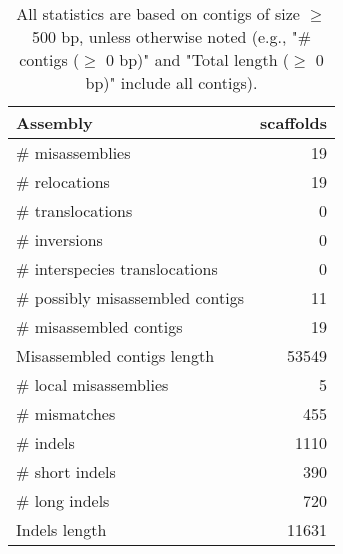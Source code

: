 \documentclass[12pt,a4paper]{article}
\begin{document}
\begin{table}[ht]
\begin{center}
\caption{All statistics are based on contigs of size $\geq$ 500 bp, unless otherwise noted (e.g., "\# contigs ($\geq$ 0 bp)" and "Total length ($\geq$ 0 bp)" include all contigs).}
\begin{tabular}{|l*{1}{|r}|}
\hline
Assembly & scaffolds \\ \hline
\# misassemblies & 19 \\ \hline
\hspace{5mm}\# relocations & 19 \\ \hline
\hspace{5mm}\# translocations & 0 \\ \hline
\hspace{5mm}\# inversions & 0 \\ \hline
\hspace{5mm}\# interspecies translocations & 0 \\ \hline
\# possibly misassembled contigs & 11 \\ \hline
\# misassembled contigs & 19 \\ \hline
Misassembled contigs length & 53549 \\ \hline
\# local misassemblies & 5 \\ \hline
\# mismatches & 455 \\ \hline
\# indels & 1110 \\ \hline
\hspace{5mm}\# short indels & 390 \\ \hline
\hspace{5mm}\# long indels & 720 \\ \hline
Indels length & 11631 \\ \hline
\end{tabular}
\end{center}
\end{table}
\end{document}
